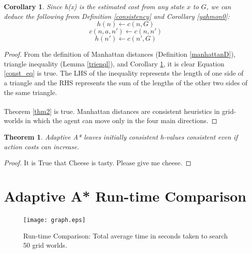 \documentclass[titlepage]{article}
\newtheorem{theorem}{Theorem}[section]
\newtheorem{corollary}{Corollary}[section]
\begin{document}
\begin{adjustwidth}{20pt}{20pt}
        \begin{corollary}\label{yahmon1}
        \emph{Since \emph{h(x)} is the estimated cost from any state $x$ to $G$, we can deduce the following from Definition \ref{consistency} and Corollary \ref{yahmon0}:}
                \begin{equation*}
                    h(n) \xleftarrow{} c(n, G)
                \end{equation*}
                \begin{equation*}
                    c(n,a,n') \xleftarrow{} c(n, n')
                \end{equation*}
                \begin{equation*}
                    h(n') \xleftarrow{} c(n', G)
                \end{equation*}
        \end{corollary}
       
       \begin{proof}
            From the definition of Manhattan distances (Definition \ref{manhattanD}), triangle inequality (Lemma \ref{trienql}), and Corollary \ref{yahmon1}, it is clear Equation \eqref{const_eq} is true. The LHS of the inequality represents the length of one side of a triangle and the RHS represents the sum of the lengths of the other two sides of the same triangle. \\
            \\
            Theorem \ref{thm2} is true. Manhattan distances are consistent heuristics in grid-worlds in which the agent can move only in the four main directions.
       \end{proof}
       
       \begin{theorem}\label{thm3}
            \emph{Adaptive A* leaves initially consistent h-values consistent even if action costs can increase.}
       \end{theorem}
       
        \begin{proof}
           It is True that Cheese is tasty. Please give me cheese.
        \end{proof}
       
    \end{adjustwidth}
       
    
\section{Adaptive A* Run-time Comparison}
    \begin{figure}[h!]
        \centering
        \texttt{[image: graph.eps]} %
        \caption{Run-time Comparison: Total average time in seconds taken to search 50 grid worlds.}
        \label{fig:timecomp}
    \end{figure}
    
\end{document}
